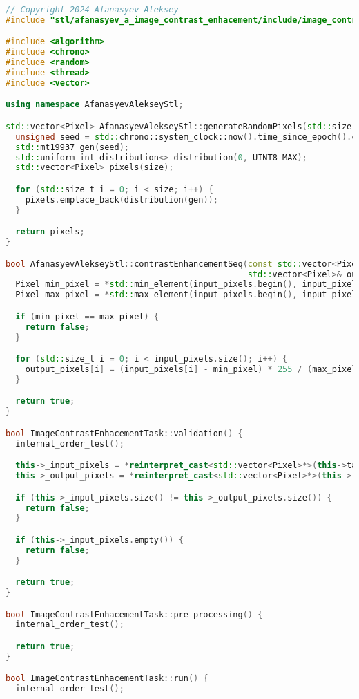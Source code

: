 \documentclass{report}
\begin{document}
\begin{lstlisting}[language=C++,caption=STL версия]
// Copyright 2024 Afanasyev Aleksey
#include "stl/afanasyev_a_image_contrast_enhacement/include/image_contrast_enhacement_task.hpp"

#include <algorithm>
#include <chrono>
#include <random>
#include <thread>
#include <vector>

using namespace AfanasyevAlekseyStl;

std::vector<Pixel> AfanasyevAlekseyStl::generateRandomPixels(std::size_t size) {
  unsigned seed = std::chrono::system_clock::now().time_since_epoch().count();
  std::mt19937 gen(seed);
  std::uniform_int_distribution<> distribution(0, UINT8_MAX);
  std::vector<Pixel> pixels(size);

  for (std::size_t i = 0; i < size; i++) {
    pixels.emplace_back(distribution(gen));
  }

  return pixels;
}

bool AfanasyevAlekseyStl::contrastEnhancementSeq(const std::vector<Pixel>& input_pixels,
                                                 std::vector<Pixel>& output_pixels) {
  Pixel min_pixel = *std::min_element(input_pixels.begin(), input_pixels.end());
  Pixel max_pixel = *std::max_element(input_pixels.begin(), input_pixels.end());

  if (min_pixel == max_pixel) {
    return false;
  }

  for (std::size_t i = 0; i < input_pixels.size(); i++) {
    output_pixels[i] = (input_pixels[i] - min_pixel) * 255 / (max_pixel - min_pixel);
  }

  return true;
}

bool ImageContrastEnhacementTask::validation() {
  internal_order_test();

  this->_input_pixels = *reinterpret_cast<std::vector<Pixel>*>(this->taskData->inputs[0]);
  this->_output_pixels = *reinterpret_cast<std::vector<Pixel>*>(this->taskData->outputs[0]);

  if (this->_input_pixels.size() != this->_output_pixels.size()) {
    return false;
  }

  if (this->_input_pixels.empty()) {
    return false;
  }

  return true;
}

bool ImageContrastEnhacementTask::pre_processing() {
  internal_order_test();

  return true;
}

bool ImageContrastEnhacementTask::run() {
  internal_order_test();


\end{lstlisting}
\end{document}
